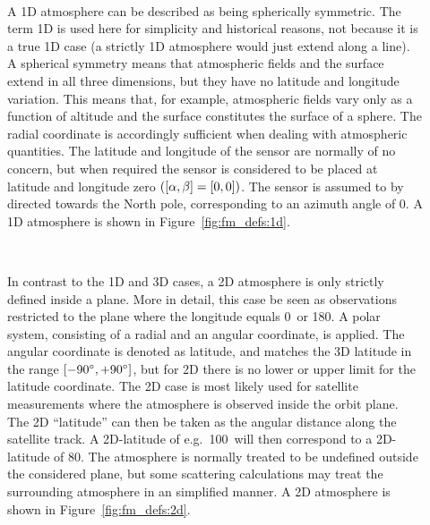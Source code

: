\begin{description}
  
\item[\,\,\,] A 1D atmosphere can be described as being
  spherically symmetric. The term 1D is used here for simplicity and historical
  reasons, not because it is a true 1D case (a strictly 1D atmosphere would
  just extend along a line). A spherical symmetry means that atmospheric fields
  and the surface extend in all three dimensions, but they have no latitude and
  longitude variation. This means that, for example, atmospheric fields vary
  only as a function of altitude and the surface constitutes the surface of a
  sphere. The radial coordinate is accordingly sufficient when dealing with
  atmospheric quantities. The latitude and longitude of the sensor are normally
  of no concern, but when required the sensor is considered to be placed at
  latitude and longitude zero $([\alpha,\beta]=[0,0])$. The sensor is assumed to
  by directed towards the North pole, corresponding to an azimuth angle of
  0\degree. A 1D atmosphere is shown in Figure~\ref{fig:fm_defs:1d}.
  
\item[\,\,\,] In contrast to the 1D and 3D cases, a 2D atmosphere
  is only strictly defined inside a plane. More in detail, this case be seen as
  observations restricted to the plane where the longitude equals 0\degree\ or
  180\degree. A polar system, consisting of a
  radial and an angular coordinate, is applied. The angular coordinate is
  denoted as latitude, and matches the 3D latitude in the range
  $[-90^\circ,+90^\circ]$, but for 2D there is no lower or upper limit for
  the latitude coordinate. The 2D case is most likely used for satellite
  measurements where the atmosphere is observed inside the orbit plane. The 2D
  ``latitude'' can then be taken as the angular distance along the satellite
  track. A 2D-latitude of e.g.\ 100\degree\ will then correspond to a
  2D-latitude of 80\degree. The atmosphere is normally treated to be undefined
  outside the considered plane, but some scattering calculations may treat the
  surrounding atmosphere in an simplified manner. A 2D atmosphere is shown in
  Figure~\ref{fig:fm_defs:2d}.


\end{description}
